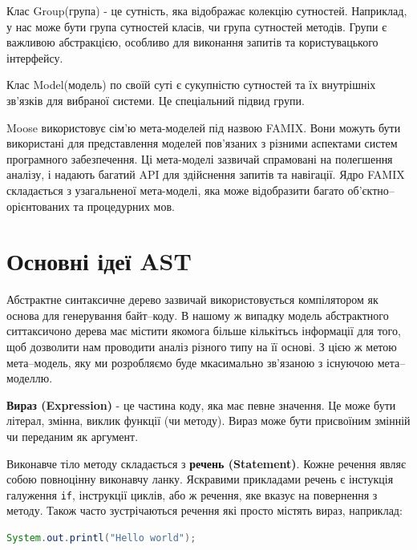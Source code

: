 \documentclass[12pt,a4paper]{article}
\begin{document}
Клас Group(група) - це сутність, яка відображає колекцію сутностей. Наприклад, у нас може бути група сутностей класів, чи група сутностей методів. Групи є важливою абстракцією, особливо для виконання запитів та користувацького інтерфейсу.

Клас Model(модель) по своїй суті є сукупністю сутностей та їх внутрішніх зв'язків для вибраної системи. Це спеціальний підвид групи.

Moose використовує сім'ю мета-моделей під назвою FAMIX. Вони можуть бути використані для представлення моделей пов'язаних з різними аспектами систем програмного забезпечення. Ці мета-моделі зазвичай спрамовані на полегшення аналізу,  і надають багатий API для здійснення запитів та навігації. Ядро FAMIX складається з узагальненої мета-моделі, яка може відобразити багато об'єктно--орієнтованих та процедурних мов. 

\clearpage

\section{Основні ідеї AST}

Абстрактне синтаксичне дерево зазвичай використовується компілятором як основа для генерування байт--коду. В нашому ж випадку модель абстрактного ситтаксичоно дерева має містити якомога більше кількітьсь інформації для того, щоб дозволити нам проводити аналіз різного типу на її основі. З цією ж метою мета--модель, яку ми розробляємо буде мкасимально зв'язаною з існуючою мета--моделлю.

\textbf{Вираз (Expression)} - це частина коду, яка має певне значення. Це може бути літерал, змінна, виклик функції (чи методу). Вираз може бути присвоїним змінній чи переданим як аргумент.

Виконавче тіло методу складається з \textbf{речень (Statement)}. Кожне речення являє собою повноцінну виконавчу ланку. Яскравими прикладами речень є інстукція галуження \lstinline$if$, інструкції циклів, або ж речення, яке вказує на повернення з методу. Також часто зустрічаються речення які просто містять вираз, наприклад:
\begin{lstlisting}[language=Java]
System.out.printl("Hello world");
\end{lstlisting}
\end{document}
